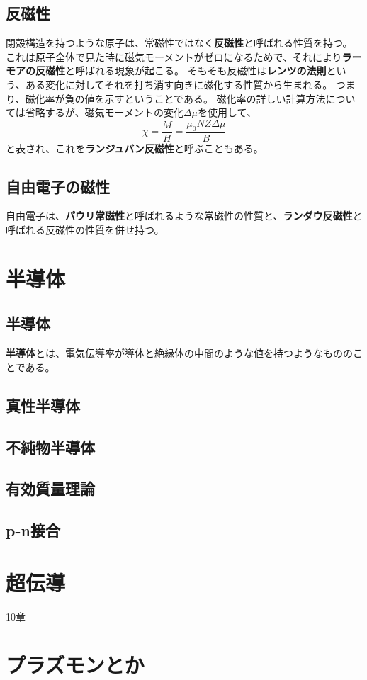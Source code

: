 \documentclass[a4paper]{jsreport}
\begin{document}
        \section{反磁性}
            閉殻構造を持つような原子は、常磁性ではなく\textbf{反磁性}と呼ばれる性質を持つ。
            これは原子全体で見た時に磁気モーメントがゼロになるためで、それにより\textbf{ラーモアの反磁性}と呼ばれる現象が起こる。
            そもそも反磁性は\textbf{レンツの法則}という、ある変化に対してそれを打ち消す向きに磁化する性質から生まれる。
            つまり、磁化率が負の値を示すということである。
            磁化率の詳しい計算方法については省略するが、磁気モーメントの変化$\Delta \mu $を使用して、
            \begin{equation}
                \chi = \frac{M}{H} = \frac{\mu_0 N Z \Delta \mu}{B}
            \end{equation}
            と表され、これを\textbf{ランジュバン反磁性}と呼ぶこともある。


        \section{自由電子の磁性}
            自由電子は、\textbf{パウリ常磁性}と呼ばれるような常磁性の性質と、\textbf{ランダウ反磁性}と呼ばれる反磁性の性質を併せ持つ。


    \chapter{半導体}
        \section{半導体}
            \textbf{半導体}とは、電気伝導率が導体と絶縁体の中間のような値を持つようなもののことである。

        \section{真性半導体}
            

        \section{不純物半導体}
        \section{有効質量理論}
        \section{p-n接合}


    \chapter{超伝導}
        10章
    \chapter{プラズモンとか}
\end{document}
